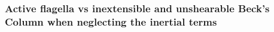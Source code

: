 
\subsubsection{Active flagella vs inextensible and unshearable Beck’s Column when neglecting the inertial terms}


